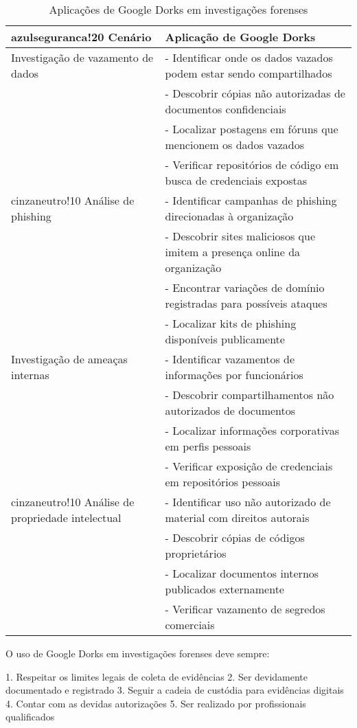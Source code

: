 \documentclass[12pt,a4paper]{book}
\begin{document}
\begin{table}[h]
\centering
\begin{tabular}{|p{4cm}|p{11cm}|}
\hline
{azulseguranca!20} \textbf{Cenário} & \textbf{Aplicação de Google Dorks} \\
\hline
Investigação de vazamento de dados & - Identificar onde os dados vazados podem estar sendo compartilhados \\
& - Descobrir cópias não autorizadas de documentos confidenciais \\
& - Localizar postagens em fóruns que mencionem os dados vazados \\
& - Verificar repositórios de código em busca de credenciais expostas \\
\hline
{cinzaneutro!10} Análise de phishing & - Identificar campanhas de phishing direcionadas à organização \\
& - Descobrir sites maliciosos que imitem a presença online da organização \\
& - Encontrar variações de domínio registradas para possíveis ataques \\
& - Localizar kits de phishing disponíveis publicamente \\
\hline
Investigação de ameaças internas & - Identificar vazamentos de informações por funcionários \\
& - Descobrir compartilhamentos não autorizados de documentos \\
& - Localizar informações corporativas em perfis pessoais \\
& - Verificar exposição de credenciais em repositórios pessoais \\
\hline
{cinzaneutro!10} Análise de propriedade intelectual & - Identificar uso não autorizado de material com direitos autorais \\
& - Descobrir cópias de códigos proprietários \\
& - Localizar documentos internos publicados externamente \\
& - Verificar vazamento de segredos comerciais \\
\hline
\end{tabular}
\caption{Aplicações de Google Dorks em investigações forenses}
\end{table}

\begin{alertbox}
O uso de Google Dorks em investigações forenses deve sempre:

1. Respeitar os limites legais de coleta de evidências
2. Ser devidamente documentado e registrado
3. Seguir a cadeia de custódia para evidências digitais
4. Contar com as devidas autorizações
5. Ser realizado por profissionais qualificados
\end{alertbox}
\end{document}
